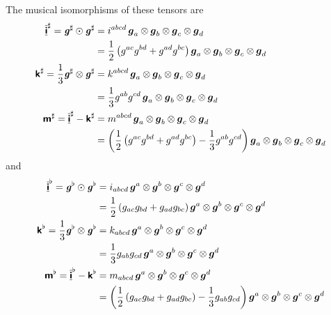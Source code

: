 The musical isomorphisms of these tensors are
\begin{align}
     \overline{\underline{\boldsymbol{\mathsf{ i }}}}  ^{\sharp} =
    \boldsymbol{\mathit{g}}^{\sharp}  \odot  \boldsymbol{\mathit{g}}^{\sharp}   &=
   i ^{abcd}\,  \boldsymbol{g} _{a} \otimes  \boldsymbol{g} _{b} \otimes  \boldsymbol{g} _{c} \otimes  \boldsymbol{g} _{d} 
  \\ \nonumber
  &=
  \dfrac{1}{2}\left( g^{ac}g^{bd}+g^{ad}g^{bc} \right)  \boldsymbol{g} _{a} \otimes  \boldsymbol{g} _{b} \otimes  \boldsymbol{g} _{c} \otimes  \boldsymbol{g} _{d} 
  \\
     \boldsymbol{\mathsf{ k }}  ^{\sharp} =
  \dfrac{1}{3}  \boldsymbol{\mathit{g}}^{\sharp}  \otimes  \boldsymbol{\mathit{g}}^{\sharp}  &=
   k ^{abcd}\,  \boldsymbol{g} _{a} \otimes  \boldsymbol{g} _{b} \otimes  \boldsymbol{g} _{c} \otimes  \boldsymbol{g} _{d} 
  \\ \nonumber
  &=\dfrac{1}{3}g^{ab}g^{cd}\,  \boldsymbol{g} _{a} \otimes  \boldsymbol{g} _{b} \otimes  \boldsymbol{g} _{c} \otimes  \boldsymbol{g} _{d} 
  \\
     \boldsymbol{\mathsf{ m }}  ^{\sharp} =
     \overline{\underline{\boldsymbol{\mathsf{ i }}}}  ^{\sharp} -   \boldsymbol{\mathsf{ k }}  ^{\sharp} &=
   m ^{abcd}\,  \boldsymbol{g} _{a} \otimes  \boldsymbol{g} _{b} \otimes  \boldsymbol{g} _{c} \otimes  \boldsymbol{g} _{d} 
  \\ \nonumber
  &=\left( \dfrac{1}{2}\left( g^{ac}g^{bd}+g^{ad}g^{bc} \right)-\dfrac{1}{3}g^{ab}g^{cd} \right)  \boldsymbol{g} _{a} \otimes  \boldsymbol{g} _{b} \otimes  \boldsymbol{g} _{c} \otimes  \boldsymbol{g} _{d} 
\end{align}
and
\begin{align}
    \overline{\underline{\boldsymbol{\mathsf{ i }}}}  ^{\flat}=
   \boldsymbol{\mathit{g}}^{\flat} \odot \boldsymbol{\mathit{g}}^{\flat} &=
  i_{abcd}\,  \boldsymbol{g} ^{a} \otimes  \boldsymbol{g} ^{b} \otimes  \boldsymbol{g} ^{c} \otimes  \boldsymbol{g} ^{d} 
  \\ \nonumber
  &=\dfrac{1}{2}\left( g_{ac}g_{bd}+g_{ad}g_{bc} \right)  \boldsymbol{g} ^{a} \otimes  \boldsymbol{g} ^{b} \otimes  \boldsymbol{g} ^{c} \otimes  \boldsymbol{g} ^{d} 
  \\
    \boldsymbol{\mathsf{ k }}  ^{\flat}=
  \dfrac{1}{3} \boldsymbol{\mathit{g}}^{\flat} \otimes \boldsymbol{\mathit{g}}^{\flat} &=
   k _{abcd}\,  \boldsymbol{g} ^{a} \otimes  \boldsymbol{g} ^{b} \otimes  \boldsymbol{g} ^{c} \otimes  \boldsymbol{g} ^{d} 
  \\ \nonumber
  &=\dfrac{1}{3}g_{ab}g_{cd}\,  \boldsymbol{g} ^{a} \otimes  \boldsymbol{g} ^{b} \otimes  \boldsymbol{g} ^{c} \otimes  \boldsymbol{g} ^{d} 
  \\
    \boldsymbol{\mathsf{ m }}  ^{\flat}=
    \overline{\underline{\boldsymbol{\mathsf{ i }}}}  ^{\flat}-  \boldsymbol{\mathsf{ k }}  ^{\flat}&=
   m _{abcd}\,  \boldsymbol{g} ^{a} \otimes  \boldsymbol{g} ^{b} \otimes  \boldsymbol{g} ^{c} \otimes  \boldsymbol{g} ^{d} 
  \\ \nonumber
  &=\left( \dfrac{1}{2}\left( g_{ac}g_{bd}+g_{ad}g_{bc} \right)-\dfrac{1}{3}g_{ab}g_{cd} \right)  \boldsymbol{g} ^{a} \otimes  \boldsymbol{g} ^{b} \otimes  \boldsymbol{g} ^{c} \otimes  \boldsymbol{g} ^{d} 
\end{align}

